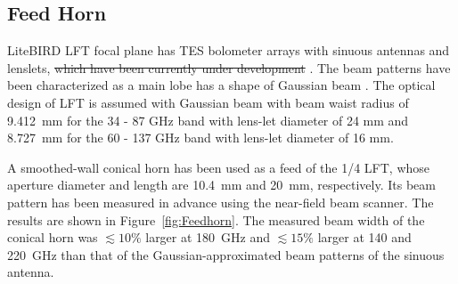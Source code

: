 \documentclass[journal]{IEEEtran}
\begin{document}
\subsection{Feed Horn}
\par
LiteBIRD LFT focal plane has TES bolometer arrays with sinuous antennas and lenslets, \sout{which have been currently under development} \cite{Suzuki2018}. 
The beam patterns have been characterized as a main lobe has a shape of Gaussian beam \cite{Edwards2012}. 
The optical design of LFT is assumed with Gaussian beam with beam waist radius of 9.412~mm for the 34 - 87 GHz band with lens-let diameter of 24 mm and 8.727~mm for the 60 - 137 GHz band with lens-let diameter of 16 mm.
\par 
A smoothed-wall conical horn has been used as a feed of the 1/4 LFT, whose aperture diameter and length are 10.4~mm and 20~mm, respectively. Its beam pattern has been measured in advance using the near-field beam scanner. The results are shown in Figure~\ref{fig:Feedhorn}. The measured beam width of the conical horn was $\lesssim 10\%$ larger at 180~GHz and $\lesssim 15\%$ larger at 140 and 220~GHz than that of the Gaussian-approximated beam patterns of the sinuous antenna.
\end{document}
